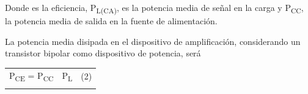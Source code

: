 \documentclass[12pt]{article}
\begin{document}
\vspace{\baselineskip}
\begin{adjustwidth}{0.0in}{0.01in}
\begin{Center}
{\fontsize{8pt}{9.6pt}\par}
\end{Center}\par

\end{adjustwidth}


\vspace{\baselineskip}

\vspace{\baselineskip}

\vspace{\baselineskip}

\vspace{\baselineskip}

\vspace{\baselineskip}
\begin{adjustwidth}{0.86in}{0.88in}
\begin{justify}
Donde es la eficiencia, P\textsubscript{L(CA)}, es la potencia media de señal en la carga y P\textsubscript{CC}, la potencia media de salida en la fuente de alimentación.
\end{justify}\par

\end{adjustwidth}


\vspace{\baselineskip}
\begin{adjustwidth}{0.86in}{0.88in}
\begin{justify}
La potencia media disipada en el dispositivo de amplificación, considerando un transistor bipolar como dispositivo de potencia, será
\end{justify}\par

\end{adjustwidth}


\vspace{\baselineskip}




\begin{table}[H]
 			\centering
\begin{tabular}{p{1.7in}p{0.81in}}
\multicolumn{1}{p{1.7in}}{P\textsubscript{CE} = P\textsubscript{CC}\ \  P\textsubscript{L}} & 
\multicolumn{1}{p{0.81in}}{(2)} \\
\hhline{~~}

\end{tabular}
 \end{table}
\end{document}
